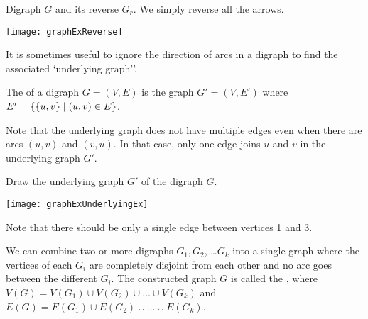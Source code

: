 \begin{Boxample}\label{exr:compute-reverse}
Digraph $G$ and its reverse $G_r$. We simply reverse all the arrows.
\begin{center}
\texttt{[image: graphExReverse]}
\end{center}
\end{Boxample}

It is sometimes useful to ignore the direction of arcs in a digraph to find the associated `underlying graph''.

\begin{Definition} 
The  of a digraph $G = (V, E)$ is the graph 
$G' = (V, E')$ where $E' = \mbox{$\{\{u, v\} \mid (u, v)\in E\}$}$.
\end{Definition}

Note that the underlying graph does not have multiple edges even when there are arcs $(u, v)$ and $(v, u)$. 
In that case, only one edge joins $u$ and $v$ in the underlying graph $G'$.  

\begin{Boxample}
Draw the underlying graph $G'$ of the digraph $G$.
\begin{center}
\texttt{[image: graphExUnderlyingEx]}
\end{center}
Note that there should be only a single edge between vertices 1 and 3.
\end{Boxample}

\begin{Definition} 
We can combine two or more digraphs $G_1, G_2$, \ldots $G_k$ into a
single graph where the vertices of each $G_i$ are completely disjoint from
each other and no arc goes between the different $G_i$. The constructed
graph $G$ is called the , where $V(G) = V(G_1) \cup
V(G_2) \cup \ldots \cup V(G_k)$ and $E(G) = E(G_1) \cup E(G_2) \cup \ldots
\cup E(G_k)$.
\end{Definition}



